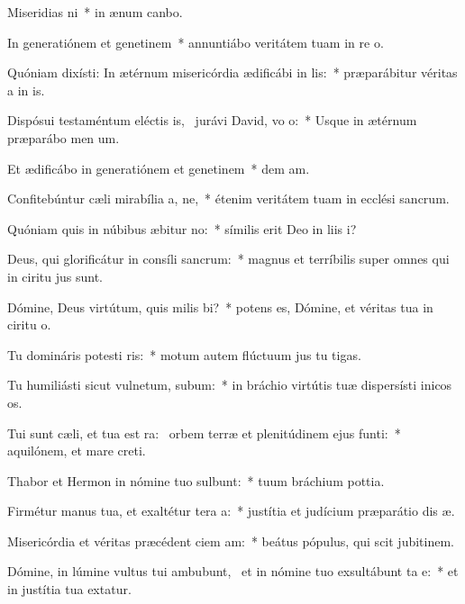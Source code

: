 \item Miseridias ni~* in ænum canbo.
\item In generatiónem et genetinem~* annuntiábo veritátem tuam in re o.
\item Quóniam dixísti: In ætérnum misericórdia ædificábi in lis:~* præparábitur véritas a in is.
\item Dispósui testaméntum eléctis is,~\pscross{} jurávi David, vo o:~* Usque in ætérnum præparábo men um.
\item Et ædificábo in generatiónem et genetinem~* dem am.
\item Confitebúntur cæli mirabília a, ne,~* étenim veritátem tuam in ecclési sancrum.
\item Quóniam quis in núbibus æbitur no:~* símilis erit Deo in liis i?
\item Deus, qui glorificátur in consíli sancrum:~* magnus et terríbilis super omnes qui in ciritu jus sunt.
\item Dómine, Deus virtútum, quis milis bi?~* potens es, Dómine, et véritas tua in ciritu o.
\item Tu domináris potesti ris:~* motum autem flúctuum jus tu tigas.
\item Tu humiliásti sicut vulnetum, subum:~* in bráchio virtútis tuæ dispersísti inicos os.
\item Tui sunt cæli, et tua est ra:~\pscross{} orbem terræ et plenitúdinem ejus  funti:~* aquilónem, et mare  creti.
\item Thabor et Hermon in nómine tuo sulbunt:~* tuum bráchium  pottia.
\item Firmétur manus tua, et exaltétur tera a:~* justítia et judícium præparátio dis æ.
\item Misericórdia et véritas præcédent ciem am:~* beátus pópulus, qui scit jubitinem.
\item Dómine, in lúmine vultus tui ambubunt,~\pscross{} et in nómine tuo exsultábunt ta e:~* et in justítia tua extatur.
